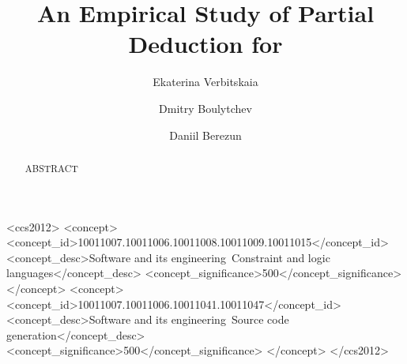 \documentclass[acmlarge]{acmart}
\begin{document}
\title{An Empirical Study of Partial Deduction for \mk{}}

\author{Ekaterina Verbitskaia}

\author{Dmitry Boulytchev}

\author{Daniil Berezun}



\renewcommand{\shortauthors}{Verbitskaia, Berezun and Boulytchev.}

\begin{abstract}
  ABSTRACT
\end{abstract}

\begin{CCSXML}
  <ccs2012>
  <concept>
  <concept_id>10011007.10011006.10011008.10011009.10011015</concept_id>
  <concept_desc>Software and its engineering~Constraint and logic languages</concept_desc>
  <concept_significance>500</concept_significance>
  </concept>
  <concept>
  <concept_id>10011007.10011006.10011041.10011047</concept_id>
  <concept_desc>Software and its engineering~Source code generation</concept_desc>
  <concept_significance>500</concept_significance>
  </concept>
  </ccs2012>
\end{CCSXML}


\maketitle





\end{document}
